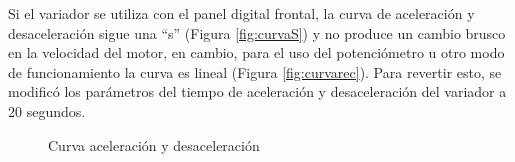 Si el variador se utiliza con el panel digital frontal, la curva de aceleración y desaceleración
sigue una “s” (Figura \ref{fig:curvaS}) y no produce un cambio brusco en la velocidad del motor, en cambio, para
el uso del potenciómetro u otro modo de funcionamiento la curva es lineal (Figura \ref{fig:curvarec}). Para revertir
esto, se modificó los parámetros del tiempo de aceleración y desaceleración del variador a 20 segundos.  


\begin{figure}[H]
	\centering
	\caption{Curva aceleración y desaceleración} \label{fig:curva}
\end{figure}


